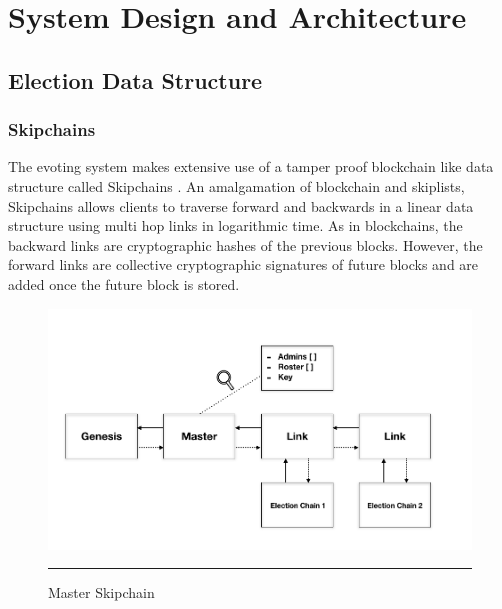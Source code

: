 
\chapter{System Design and Architecture} %

\label{Chapter2} %



\section{Election Data Structure}

\subsection{Skipchains}

The evoting system makes extensive use of a tamper proof blockchain like data structure called Skipchains \cite{skipchains}. An amalgamation of blockchain and skiplists, Skipchains allows clients to traverse forward and backwards in a linear data structure using multi hop links in logarithmic time. As in blockchains, the backward links are cryptographic hashes of the previous blocks. However, the forward links are collective cryptographic signatures of future blocks and are added once the future block is stored.

\begin{figure}[ht]
  \centering
    \includegraphics[scale=0.4]{Figures/MasterSkipchain.png}
    \rule{35em}{0.5pt}
  \caption[Master Skipchain]{Master Skipchain}
  \label{fig:MasterSkipchain}
\end{figure}

